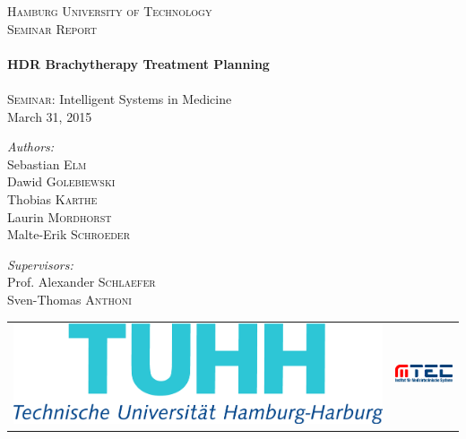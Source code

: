 \begin{titlepage}
\begin{center}
\textsc{\LARGE Hamburg University of Technology}\\
[2.5cm]

\textsc{\LARGE Seminar Report}\\
[0.3cm]

\HRule \\[0.35cm]
{
\huge \bfseries HDR Brachytherapy Treatment Planning \\[0.35cm]
}
\HRule \\[0.7cm]

{\large \textsc{Seminar:} Intelligent Systems in Medicine}\\[0.2cm]

{\large March 31, 2015}\\[3.5cm]

\noindent
\begin{minipage}[t]{0.49\textwidth}
\begin{flushleft}
\emph{Authors:}\\
Sebastian \textsc{Elm} \\
Dawid \textsc{Golebiewski} \\
Thobias \textsc{Karthe} \\
Laurin \textsc{Mordhorst} \\
Malte-Erik \textsc{Schroeder} 
\end{flushleft}
\end{minipage}
\begin{minipage}[t]{0.49\textwidth}
\begin{flushright}
\emph{Supervisors:}\\
Prof. Alexander \textsc{Schlaefer} \\
Sven-Thomas \textsc{Anthoni}
\end{flushright}
\end{minipage}
\end{center}

\vfill
\begin{tabular}{l r}
\includegraphics[width=.43\textwidth]{pictures/logo_tuhh.png} & \includegraphics[width=.37\textwidth]{pictures/logo_mtec.png}
\end{tabular}
\end{titlepage}